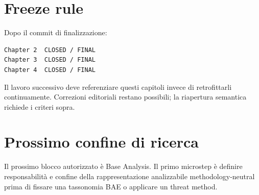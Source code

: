 \documentclass[11pt,a4paper]{article}
\begin{document}
\section{Freeze rule}
Dopo il commit di finalizzazione:
\begin{lstlisting}
Chapter 2  CLOSED / FINAL
Chapter 3  CLOSED / FINAL
Chapter 4  CLOSED / FINAL
\end{lstlisting}
Il lavoro successivo deve referenziare questi capitoli invece di retrofittarli continuamente. Correzioni editoriali restano possibili; la riapertura semantica richiede i criteri sopra.

\section{Prossimo confine di ricerca}
Il prossimo blocco autorizzato è Base Analysis. Il primo microstep è definire responsabilità e confine della rappresentazione analizzabile methodology-neutral prima di fissare una tassonomia BAE o applicare un threat method.
\end{document}
